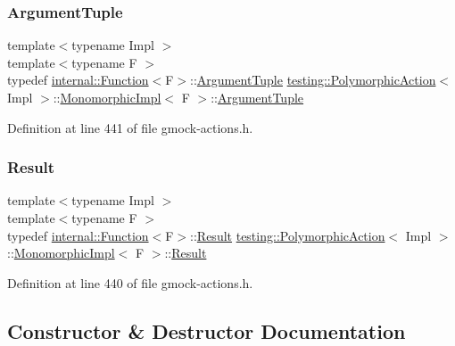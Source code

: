 \subsubsection{\texorpdfstring{Argument\+Tuple}{ArgumentTuple}}
{\footnotesize\ttfamily template$<$typename Impl $>$ \\
template$<$typename F $>$ \\
typedef \hyperlink{structtesting_1_1internal_1_1Function}{internal\+::\+Function}$<$F$>$\+::\hyperlink{classtesting_1_1ActionInterface_af72720d864da4d606629e83edc003511}{Argument\+Tuple} \hyperlink{classtesting_1_1PolymorphicAction}{testing\+::\+Polymorphic\+Action}$<$ Impl $>$\+::\hyperlink{classtesting_1_1PolymorphicAction_1_1MonomorphicImpl}{Monomorphic\+Impl}$<$ F $>$\+::\hyperlink{classtesting_1_1ActionInterface_af72720d864da4d606629e83edc003511}{Argument\+Tuple}}



Definition at line 441 of file gmock-\/actions.\+h.

\mbox{\label{classtesting_1_1PolymorphicAction_1_1MonomorphicImpl_a7989da669c4c7a2da978ed78743815cb}} 
\subsubsection{\texorpdfstring{Result}{Result}}
{\footnotesize\ttfamily template$<$typename Impl $>$ \\
template$<$typename F $>$ \\
typedef \hyperlink{structtesting_1_1internal_1_1Function}{internal\+::\+Function}$<$F$>$\+::\hyperlink{classtesting_1_1ActionInterface_a7477de2fe3e4e01c59db698203acaee7}{Result} \hyperlink{classtesting_1_1PolymorphicAction}{testing\+::\+Polymorphic\+Action}$<$ Impl $>$\+::\hyperlink{classtesting_1_1PolymorphicAction_1_1MonomorphicImpl}{Monomorphic\+Impl}$<$ F $>$\+::\hyperlink{classtesting_1_1ActionInterface_a7477de2fe3e4e01c59db698203acaee7}{Result}}



Definition at line 440 of file gmock-\/actions.\+h.



\subsection{Constructor \& Destructor Documentation}
\mbox{\label{classtesting_1_1PolymorphicAction_1_1MonomorphicImpl_a0f87e4646298d9fd8e7eda04a09fc6d0}} 

